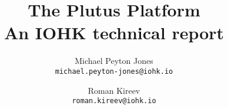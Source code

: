\documentclass{article}
\theoremstyle{break}
\begin{document}
\title{The Plutus Platform \\
  {\large \sc An IOHK technical report}}
\date{}
\author{
  Michael Peyton Jones \\ {\small \texttt{michael.peyton-jones@iohk.io}} \\
  \and Roman Kireev \\ {\small \texttt{roman.kireev@iohk.io}}
}

\maketitle

\tableofcontents







\printglossaries
\glsaddall

\printbibliography[heading=bibintoc]
\end{document}
